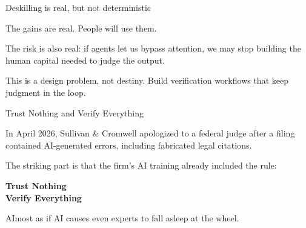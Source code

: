 \documentclass[aspectratio=169,11pt]{beamer}
\begin{document}
\begin{frame}{Deskilling is real, but not deterministic}

The gains are real. People will use them.

\vspace{0.2cm}

The risk is also real: if agents let us bypass attention, we may stop building the human capital needed to judge the output.

\vspace{0.2cm}

\begin{center}
\end{center}

\vspace{0.1cm}

\alert{This is a design problem, not destiny. Build verification workflows that keep judgment in the loop.}

\end{frame}




\begin{frame}{Trust Nothing and Verify Everything}

In April 2026, Sullivan \& Cromwell apologized to a federal judge after a filing contained AI-generated errors, including fabricated legal citations.

\vspace{0.35cm}

The striking part is that the firm's AI training already included the rule:

\vspace{0.35cm}

\begin{center}
{\Huge \textbf{Trust Nothing}}\\[0.2cm]
{\Huge \textbf{Verify Everything}}
\end{center}

\vspace{0.3cm}

\alert{AImost as if AI causes even experts to fall asleep at the wheel.}

\end{frame}
\end{document}
